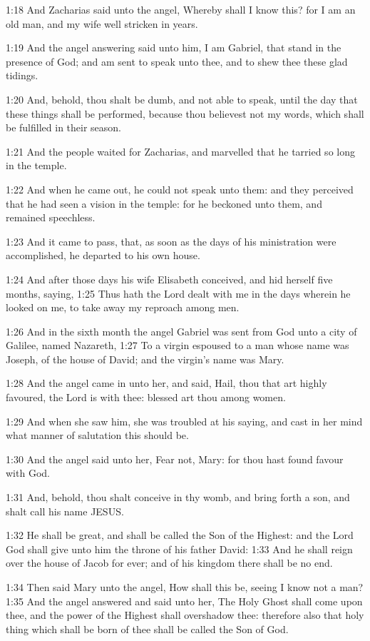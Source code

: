 1:18 And Zacharias said unto the angel, Whereby shall I know this? for I am an old man, and my wife well stricken in years.

1:19 And the angel answering said unto him, I am Gabriel, that stand in the presence of God; and am sent to speak unto thee, and to shew thee these glad tidings.

1:20 And, behold, thou shalt be dumb, and not able to speak, until the day that these things shall be performed, because thou believest not my words, which shall be fulfilled in their season.

1:21 And the people waited for Zacharias, and marvelled that he tarried so long in the temple.

1:22 And when he came out, he could not speak unto them: and they perceived that he had seen a vision in the temple: for he beckoned unto them, and remained speechless.

1:23 And it came to pass, that, as soon as the days of his ministration were accomplished, he departed to his own house.

1:24 And after those days his wife Elisabeth conceived, and hid herself five months, saying, 1:25 Thus hath the Lord dealt with me in the days wherein he looked on me, to take away my reproach among men.

1:26 And in the sixth month the angel Gabriel was sent from God unto a city of Galilee, named Nazareth, 1:27 To a virgin espoused to a man whose name was Joseph, of the house of David; and the virgin's name was Mary.

1:28 And the angel came in unto her, and said, Hail, thou that art highly favoured, the Lord is with thee: blessed art thou among women.

1:29 And when she saw him, she was troubled at his saying, and cast in her mind what manner of salutation this should be.

1:30 And the angel said unto her, Fear not, Mary: for thou hast found favour with God.

1:31 And, behold, thou shalt conceive in thy womb, and bring forth a son, and shalt call his name JESUS.

1:32 He shall be great, and shall be called the Son of the Highest: and the Lord God shall give unto him the throne of his father David: 1:33 And he shall reign over the house of Jacob for ever; and of his kingdom there shall be no end.

1:34 Then said Mary unto the angel, How shall this be, seeing I know not a man?  1:35 And the angel answered and said unto her, The Holy Ghost shall come upon thee, and the power of the Highest shall overshadow thee: therefore also that holy thing which shall be born of thee shall be called the Son of God.

